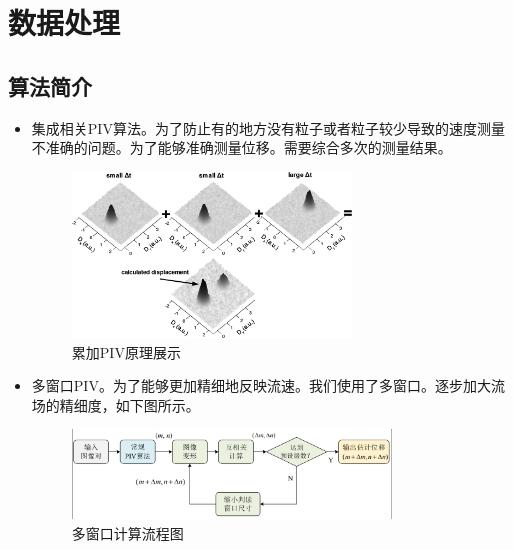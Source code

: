 \documentclass[12pt]{article}
\begin{document}
\section{数据处理}

\subsection{算法简介}
\begin{itemize}
    \item 集成相关PIV算法。为了防止有的地方没有粒子或者粒子较少导致的速度测量不准确的问题。为了能够准确测量位移。需要综合多次的测量结果。
    \begin{figure}[H]
        \centering
        \includegraphics[width=0.7\textwidth]{Images/累加PIV原理展示.png}
        \caption{累加PIV原理展示}
    \end{figure}
    \item 多窗口PIV。为了能够更加精细地反映流速。我们使用了多窗口。逐步加大流场的精细度，如下图所示。
    \begin{figure}[H]
        \centering
        \includegraphics[width=0.8\textwidth]{Images/多窗口示意图.png}
        \caption{多窗口计算流程图}
    \end{figure}
\end{itemize}
\end{document}
